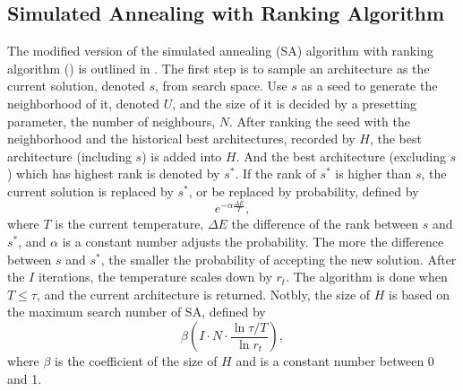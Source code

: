\documentclass[sigconf]{acmart}
\begin{document}
    \subsection{Simulated Annealing with Ranking Algorithm}

    The modified version of the simulated annealing (SA) algorithm with ranking algorithm (\palg{})
    is outlined in . The first step is to sample an architecture as the current 
    solution, denoted $s$, from search space. Use $s$ as a seed to generate the 
    neighborhood of it, denoted $U$, and the size of it is decided by a presetting parameter, 
    the number of neighbours, $N$. 
    After ranking the seed with the neighborhood and the historical best architectures, recorded by $H$, 
    the best architecture (including $s$) is added into $H$.
    And the best architecture (excluding $s$) which has highest rank is denoted by $s^*$. 
    If the rank of $s^*$ is higher than $s$, the current solution is replaced by $s^*$, or be 
    replaced by probability, defined by 
    \begin{equation}
        \label{equ:SA_rk_prob}
        e^{-\alpha\frac{\Delta E}{T}},
    \end{equation}
    where $T$ is the current temperature, $\Delta E$ the difference of the rank between 
    $s$ and $s^*$, and $\alpha$ is a constant number adjusts the probability. The more 
    the difference between $s$ and $s^*$, the smaller the probability of accepting the new solution. 
    After the $I$ iterations, the temperature scales down by $r_t$. The algorithm 
    is done when $T\leq\tau$, and the current architecture is returned. 
    Notbly, the size of $H$ is based on the maximum search number of SA, defined by 
    \begin{equation}
        \label{equ:SA_rk_size_of_H}
        \beta (I\cdot N\cdot\frac{\ln{\tau/T}}{\ln{r_t}}),
    \end{equation}
    where $\beta$ is the coefficient of the size of $H$ and is a constant number between 0 and 1.
\end{document}
